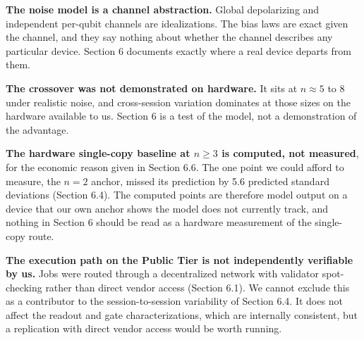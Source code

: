 %
%

\textbf{The noise model is a channel abstraction.} Global depolarizing
and independent per-qubit channels are idealizations. The bias laws are
exact given the channel, and they say nothing about whether the channel
describes any particular device. Section 6 documents exactly where a
real device departs from them.

\textbf{The crossover was not demonstrated on hardware.} It sits at
\(n \approx 5\) to \(8\) under realistic noise, and
cross-session variation dominates at those sizes on the hardware available to
us. Section 6 is a test of the model, not a demonstration of the
advantage.

\textbf{The hardware single-copy baseline at \(n \geq 3\) is computed,
not measured}, for the economic reason given in Section 6.6. The one
point we could afford to measure, the \(n = 2\) anchor, missed its
prediction by 5.6 predicted standard deviations (Section 6.4). The computed points are
therefore model output on a device that our own anchor shows the model
does not currently track, and nothing in Section 6 should be read as a
hardware measurement of the single-copy route.

\textbf{The execution path on the Public Tier is not independently
verifiable by us.} Jobs were routed through a decentralized network with
validator spot-checking rather than direct vendor access (Section 6.1).
We cannot exclude this as a contributor to the session-to-session
variability of Section 6.4. It does not affect the readout and gate
characterizations, which are internally consistent, but a replication
with direct vendor access would be worth running.
